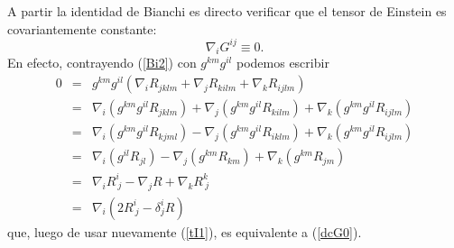 A partir la identidad de Bianchi es directo verificar que el tensor de Einstein es covariantemente constante:
\begin{equation}
\boxed{\nabla_i G^{ij}\equiv 0.} \label{dcG0}
\end{equation}
En efecto, contrayendo (\ref{Bi2}) con $g^{k m}g^{il}$ podemos escribir
\begin{eqnarray}
0&=&g^{k m}g^{il}\left( \nabla_iR_{jklm}+\nabla_jR_{kil m}+\nabla_kR_{ij
l m}\right) \\
&=&\nabla_i\left(g^{k m}g^{il}R_{jklm}\right)+\nabla_j\left(g^{k m}g^{il}R_{kil m}\right)+\nabla_k\left(g^{k m}g^{il}R_{ijl m}\right) \\
&=&\nabla_i\left(g^{k m}g^{il}R_{kjml}\right)-\nabla_j\left(g^{k m}g^{il}R_{ikl m}\right)+\nabla_k\left(g^{k m}g^{il}R_{ijl m}\right) \\
&=&\nabla_i\left(g^{il}R_{jl}\right)-\nabla_j\left(g^{k m}R_{km}\right)+\nabla_k\left(g^{k m}R_{jm}\right) \\
&=&\nabla_iR^i_{\ j}-\nabla_jR+\nabla_kR^k_{\ j} \\
&=&\nabla_i\left(2R^i_{\ j}-\delta^i_jR\right)
\end{eqnarray}
que, luego de usar nuevamente (\ref{tI1}), es equivalente a (\ref{dcG0}).

